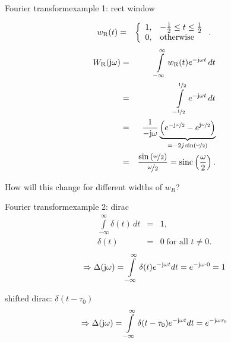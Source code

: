 	\begin{frame}{Fourier transform}{example 1: rect window}
        \vspace{-8mm}
        \begin{footnotesize}
        \begin{eqnarray*}
            w_{\mathrm{R}}(t)	&=& \left\lbrace  
                        \begin{array}{ll} 
                                                    1, & -\frac{1}{2} \leq t \leq \frac{1}{2}\\ 
                          \vphantom{\frac{1}{1}} 	0, & \text{otherwise} \\ 
                        \end{array} 
                        \right. .
        \end{eqnarray*}
\pause
        \begin{eqnarray*}
            W_{\mathrm{R}}(\mathrm{j}\omega) 	&=& \int\limits_{-\infty}^{\infty} {w_{\mathrm{R}}(t){e}^{-\mathrm{j}\omega t}\,dt}\nonumber\\
                        &=& \int\limits_{-\nicefrac{1}{2}}^{\nicefrac{1}{2}} {{e}^{-\mathrm{j}\omega t}\,dt}\nonumber\\
                        &=& \frac{1}{-\mathrm{j}\omega} \underbrace{\left({e}^{-\mathrm{j}\nicefrac{\omega}{2}}-{e}^{\mathrm{j}\nicefrac{\omega}{2}}\right)}_{= -2j\sin\left(\nicefrac{\omega}{2}\right)}\nonumber\\
                        &=& \frac{\sin\left(\nicefrac{\omega}{2}\right)}{\nicefrac{\omega}{2}} = \operatorname*{sinc}\left(\frac{\omega}{2}\right) .
        \end{eqnarray*}
        \end{footnotesize}
        \pause
        
        How will this change for different widths of $w_R$?
	\end{frame}	

	\begin{frame}{Fourier transform}{example 2: dirac}
        \vspace{-5mm}
        \begin{eqnarray*} %
            \int\limits_{-\infty}^{\infty} \delta(t)\, dt &=& 1\label{eq:dirac_int} ,\\
            \delta(t) &=& 0\; \text{for all } t\neq 0 .
        \end{eqnarray*}
        \pause
        \begin{equation*}
            \Rightarrow \Delta(\mathrm{j}\omega) = \int\limits_{-\infty}^\infty \delta(t)e^{-\mathrm{j}\omega t}dt = e^{-\mathrm{j}\omega \cdot 0} = 1
        \end{equation*}
        \pause
        
        \bigskip
        shifted dirac: $\delta(t-\tau_0)$
         \begin{equation*}
            \Rightarrow \Delta(\mathrm{j}\omega) = \int\limits_{-\infty}^\infty \delta(t-\tau_0)e^{-\mathrm{j}\omega t}dt = e^{-\mathrm{j}\omega \tau_0}
        \end{equation*}
   \end{frame}	

